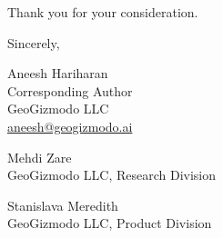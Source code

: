 \documentclass[11pt]{article}
\begin{document}
\noindent
Thank you for your consideration.

\vspace{0.4cm}

\noindent
Sincerely,

\vspace{0.3cm}

\noindent
Aneesh Hariharan \\
Corresponding Author \\
GeoGizmodo LLC \\
\href{mailto:aneesh@geogizmodo.ai}{aneesh@geogizmodo.ai}

\vspace{0.3cm}

\noindent
Mehdi Zare \\
GeoGizmodo LLC, Research Division

\vspace{0.2cm}

\noindent
Stanislava Meredith \\
GeoGizmodo LLC, Product Division
\end{document}

